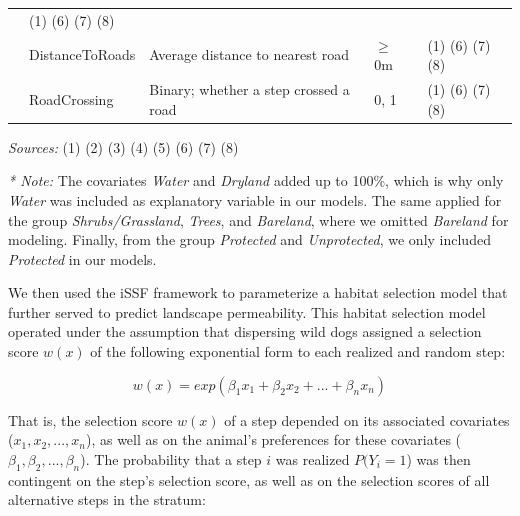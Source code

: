 \documentclass[abstract=off,10pt,a4paper,bibliography=totocnumbered]{article}
\begin{document}
\begin{table}[hbtp]
\begin{center}
{\begin{threeparttable}
\begin{tabular}{lllll}
                & (1) (6) (7) (8)\\
          & DistanceToRoads
            & Average distance to nearest road
              & \(\geq\) 0m
                & (1) (6) (7) (8)\\
          & RoadCrossing
            & Binary; whether a step crossed a road
              & 0, 1
                & (1) (6) (7) (8)\\
        \hline
        \end{tabular}
        \begin{tablenotes}
          \item \textit{Sources:} (1) \cite{Chen.2015} (2) \cite{Schaaf.2015}
          (3) \cite{Yamazaki.2019} (4) \cite{Dimiceli.2015} (5)
          \cite{PeaceParks.2019} (6) \cite{Facebook.2019} (7)
          \cite{OpenStreetMap.2019} (8) \cite{Xiong.2017}
          \item
          \item \textit{* Note:} The covariates \textit{Water} and
          \textit{Dryland} added up to 100\%, which is why only \textit{Water}
          was included as explanatory variable in our models. The same applied
          for the group \textit{Shrubs/Grassland}, \textit{Trees}, and
          \textit{Bareland}, where we omitted \textit{Bareland} for modeling.
          Finally, from the group \textit{Protected} and \textit{Unprotected},
          we only included \textit{Protected} in our models.
        \end{tablenotes}
      \end{threeparttable}
    }
  \end{center}
\end{table}

\noindent We then used the iSSF framework to parameterize a habitat selection
model that further served to predict landscape permeability. This habitat
selection model operated under the assumption that dispersing wild dogs assigned
a selection score \(w(x)\) of the following exponential form to each realized
and random step:

\begin{equation}
\label{EQ2}
  w(x) = exp(\beta_1 x_1 + \beta_2 x_2 + ... + \beta_n x_n)
\end{equation}

\noindent That is, the selection score \(w(x)\) of a step depended on its
associated covariates (\(x_1, x_2, ..., x_n\)), as well as on the animal's
preferences for these covariates (\(\beta_1, \beta_2, ..., \beta_n\)). The
probability that a step \(i\) was realized \(P(Y_{i} = 1\)) was then contingent
on the step's selection score, as well as on the selection scores of all
alternative steps in the stratum:
\end{document}
